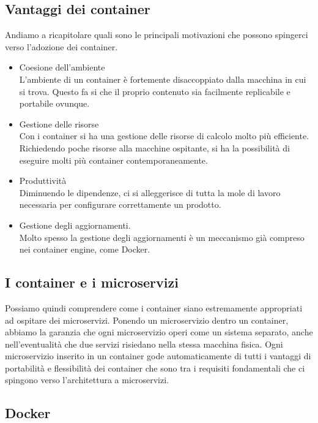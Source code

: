 \subsection{Vantaggi dei container}
Andiamo a ricapitolare quali sono le principali motivazioni che possono spingerci verso l'adozione dei container.
\begin{itemize}
	\item Coesione dell'ambiente \\
	L'ambiente di un container è fortemente disaccoppiato dalla macchina in cui si trova. Questo fa si che il proprio contenuto sia facilmente replicabile e portabile ovunque.
	
	\item Gestione delle risorse \\
	Con i container si ha una gestione delle risorse di calcolo molto più efficiente. Richiedendo poche risorse alla macchine ospitante, si ha la possibilità di eseguire molti più container contemporaneamente. 
	
	\item Produttività \\
	Diminuendo le dipendenze, ci si alleggerisce di tutta la mole di lavoro necessaria per configurare correttamente un prodotto. 
	
	\item Gestione degli aggiornamenti. \\
	Molto spesso la gestione degli aggiornamenti è un meccanismo già compreso nei container engine, come Docker.
\end{itemize}

\subsection{I container e i microservizi}
Possiamo quindi comprendere come i container siano estremamente appropriati ad ospitare dei microservizi. Ponendo un microservizio dentro un container, abbiamo la garanzia che ogni microservizio operi come un sistema separato, anche nell'eventualità che due servizi risiedano nella stessa macchina fisica. Ogni microservizio inserito in un container gode automaticamente di tutti i vantaggi di portabilità e flessibilità dei container che sono tra i requisiti fondamentali che ci spingono verso l'architettura a microservizi.

\subsection{Docker}

